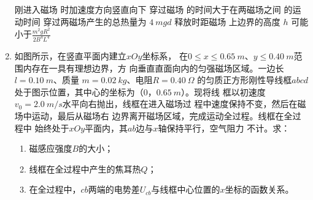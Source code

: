 \begin{enumerate}
\fourchoices
{刚进入磁场  时加速度方向竖直向下}
{穿过磁场  的时间大于在两磁场之间 的运动时间}
{穿过两磁场产生的总热量为 $ 4 \ m gd $}
{释放时距磁场  上边界的高度 $ h $ 可能小于$\frac{m^{2} g R^{2}}{2 B^{4} L^{4}}$}

\item 
{}
如图所示，在竖直平面内建立$ xOy $坐标系，
在$ 0 \leq x \leq 0.65 \ m $、$ y \leq 0.40 \ m $范围内存在一具有理想边界，方
向垂直直面向内的匀强磁场区域。一边长$ l=0.10 \ m $、质量
$ m=0.02 \ kg $、电阻$ R=0.40 \ \Omega $ 的匀质正方形刚性导线框$ abcd $
处于图示位置，其中心的坐标为（$ 0 $，$ 0.65 \ m $）。现将线
框以初速度$ v_{0}=2.0 \ m /s $水平向右抛出，线框在进入磁场过
程中速度保持不变，然后在磁场中运动，最后从磁场右
边界离开磁场区域，完成运动全过程。线框在全过程中
始终处于$ xOy $平面内，其$ ab $边与$ x $轴保持平行，空气阻力
不计。求：
\begin{enumerate}
\item
磁感应强度$ B $的大小；

\item 
线框在全过程中产生的焦耳热$ Q $；
\item 
在全过程中，$ cb $两端的电势差$ U_{cb} $与线框中心位置的$ x $坐标的函数关系。

\end{enumerate}
\begin{figure}[h!]
\flushright

\end{figure}




\end{enumerate}

